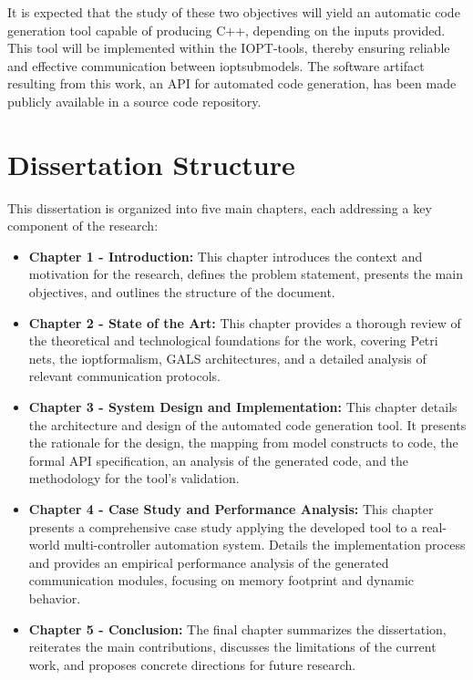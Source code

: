 It is expected that the study of these two objectives will yield an automatic code generation tool capable of producing C++, depending on the inputs provided. This tool will be implemented within the IOPT-tools, thereby ensuring reliable and effective communication between \gls{iopt}submodels.
The software artifact resulting from this work, an API for automated code generation, has been made publicly available in a source code repository.




\section{Dissertation Structure}
\label{sec:dissertation_structure}


This dissertation is organized into five main chapters, each addressing a key component of the research:

\begin{itemize}
    \item \textbf{Chapter 1 - Introduction:} This chapter introduces the context and motivation for the research, defines the problem statement, presents the main objectives, and outlines the structure of the document.

    \item \textbf{Chapter 2 - State of the Art:} This chapter provides a thorough review of the theoretical and technological foundations for the work, covering Petri nets, the \gls{iopt}formalism, GALS architectures, and a detailed analysis of relevant communication protocols.

    \item \textbf{Chapter 3 - System Design and Implementation:} This chapter details the architecture and design of the automated code generation tool. It presents the rationale for the design, the mapping from model constructs to code, the formal API specification, an analysis of the generated code, and the methodology for the tool's validation.

    \item \textbf{Chapter 4 - Case Study and Performance Analysis:} This chapter presents a comprehensive case study applying the developed tool to a real-world multi-controller automation system. Details the implementation process and provides an empirical performance analysis of the generated communication modules, focusing on memory footprint and dynamic behavior.

    \item \textbf{Chapter 5 - Conclusion:} The final chapter summarizes the dissertation, reiterates the main contributions, discusses the limitations of the current work, and proposes concrete directions for future research.
\end{itemize}


